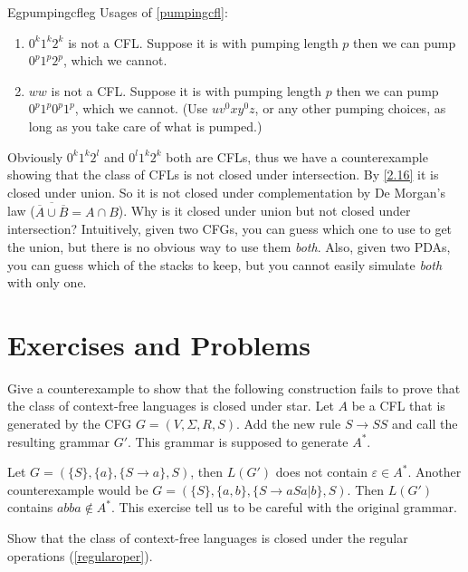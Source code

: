 \begin{reference}{Eg}{pumpingcfleg} Usages of \ref{pumpingcfl}:
  \begin{enumerate}
    \item $0^k1^k2^k$ is not a CFL. Suppose it is with pumping length $p$ then we can pump $0^p1^p2^p$, which we cannot.
    \item $ww$ is not a CFL. Suppose it is with pumping length $p$ then we can pump $0^p1^p0^p1^p$, which we cannot. (Use $uv^0xy^0z$, or any other pumping choices, as long as you take care of what is pumped.)\qedhere
  \end{enumerate}
\end{reference}

Obviously $0^k1^k2^l$ and $0^l1^k2^k$ both are CFLs, thus we have a counterexample showing that the class of CFLs is not closed under intersection. By \ref{2.16} it is closed under union. So it is not closed under complementation by De Morgan's law ($\overline{\overline{A}\cup \overline{B}}=A\cap B$). Why is it closed under union but not closed under intersection? Intuitively, given two CFGs, you can guess which one to use to get the union, but there is no obvious way to use them \textit{both}. Also, given two PDAs, you can guess which of the stacks to keep, but you cannot easily simulate \textit{both} with only one.

\section*{Exercises and Problems}

\setcounter{exercise}{14}

\begin{exercise}
  Give a counterexample to show that the following construction fails to prove that the class of context-free languages is closed under star. Let \( A \) be a CFL that is generated by the CFG \( G = (V, \Sigma, R, S) \). Add the new rule \( S \rightarrow SS \) and call the resulting grammar \( G' \). This grammar is supposed to generate \( A^* \).
\end{exercise}

Let $G=(\{S\}, \{a\}, \{S\to a\}, S)$, then $L(G')$ does not contain $\varepsilon\in A^*$. Another counterexample would be $G=(\{S\},\{a,b\},\{S\to aSa|b\},S)$. Then $L(G')$ contains $abba\notin A^*$. This exercise tell us to be careful with the original grammar.

\begin{exercise}
  Show that the class of context-free languages is closed under the regular operations (\ref{regularoper}).
\end{exercise}

